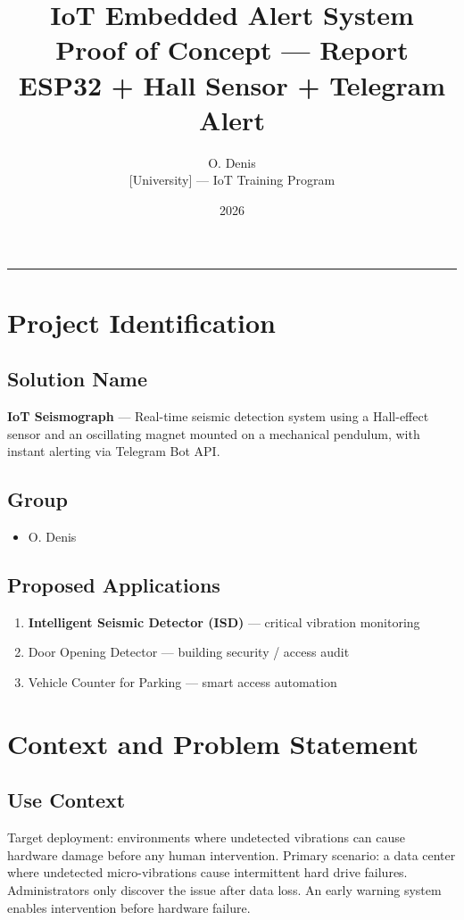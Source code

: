 \documentclass[11pt,a4paper]{article}
\title{
  \vspace{-1cm}
  \textbf{\Large IoT Embedded Alert System} \\[0.4em]
  \large Proof of Concept — Report \\[0.2em]
  \normalsize ESP32 + Hall Sensor + Telegram Alert
}
\author{O. Denis \\ \small [University] — IoT Training Program}
\date{2026}
\begin{document}
\maketitle
\thispagestyle{fancy}
\tableofcontents
\vspace{1em}
\hrule
\vspace{1em}

\section{Project Identification}

\subsection{Solution Name}
\textbf{IoT Seismograph} — Real-time seismic detection system using a Hall-effect sensor and an oscillating magnet mounted on a mechanical pendulum, with instant alerting via Telegram Bot API.

\subsection{Group}
\begin{itemize}[noitemsep]
  \item O. Denis
\end{itemize}

\subsection{Proposed Applications}
\begin{enumerate}[noitemsep]
  \item \textbf{Intelligent Seismic Detector (ISD)} — critical vibration monitoring
  \item Door Opening Detector — building security / access audit
  \item Vehicle Counter for Parking — smart access automation
\end{enumerate}

\section{Context and Problem Statement}

\subsection{Use Context}
Target deployment: environments where undetected vibrations can cause hardware damage before any human intervention. Primary scenario: a data center where undetected micro-vibrations cause intermittent hard drive failures. Administrators only discover the issue after data loss. An early warning system enables intervention before hardware failure.
\end{document}
